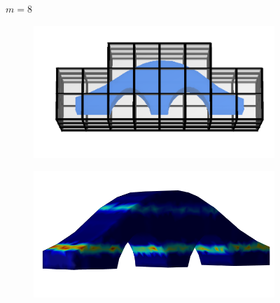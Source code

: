 \documentclass[11pt,titlepage]{article}
\begin{document}
\begin{figure}[!htbp]
    \begin{center}
        $m=8$
        \quad
        \begin{subfigure}[b]{0.4\textwidth}
            \centering
            \includegraphics[width=\textwidth]{hex/resized/archbridge_cage_1}
        \end{subfigure}
        \begin{subfigure}[b]{0.35\textwidth}
            \centering
            \includegraphics[width=\textwidth]{hex/resized/archbridge_1}
        \end{subfigure}\\ 


\end{center}
\end{figure}
\end{document}
